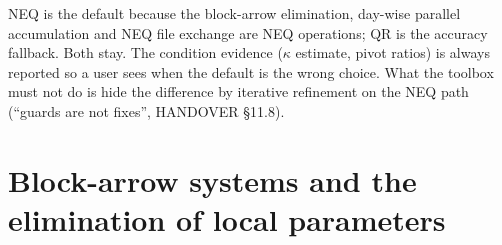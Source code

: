 \begin{principle}
NEQ is the default because the block-arrow elimination, day-wise parallel accumulation and NEQ file exchange are NEQ operations; QR is the accuracy fallback. Both stay. The condition evidence ($\kappa$ estimate, pivot ratios) is always reported so a user sees when the default is the wrong choice. What the toolbox must not do is hide the difference by iterative refinement on the NEQ path (``guards are not fixes'', HANDOVER §11.8).
\end{principle}

\section{Block-arrow systems and the elimination of local parameters}
\label{sec:blockarrow}

